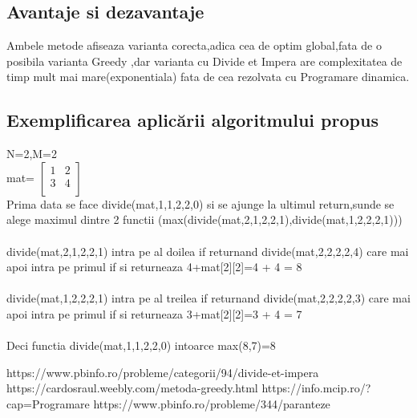 \documentclass[runningheads]{llncs}
\begin{document}
\subsection{Avantaje si dezavantaje}
Ambele metode afiseaza varianta corecta,adica cea de optim global,fata de o posibila varianta Greedy
,dar varianta cu Divide et Impera are complexitatea de timp mult mai mare(exponentiala) fata de cea rezolvata cu Programare dinamica.
\subsection{Exemplificarea aplicării algoritmului propus}
N=2,M=2\\
mat=
$\begin{bmatrix} 
	1 & 2 \\
	3 & 4  \\

\end{bmatrix}$\\
Prima data se face divide(mat,1,1,2,2,0) si se ajunge la ultimul return,sunde se alege maximul dintre 2 functii
(max(divide(mat,2,1,2,2,1),divide(mat,1,2,2,2,1)))\\
\\
divide(mat,2,1,2,2,1) intra pe al doilea if returnand divide(mat,2,2,2,2,4) care mai apoi intra pe primul if si returneaza 4+mat[2][2]=4 + 4 = 8\\
\\
divide(mat,1,2,2,2,1) intra pe al treilea if returnand divide(mat,2,2,2,2,3) care mai apoi intra pe primul if si returneaza 3+mat[2][2]=3 + 4 = 7\\
\\
Deci functia divide(mat,1,1,2,2,0) intoarce max(8,7)=8\\



\begin{thebibliography}{8}
https://www.pbinfo.ro/probleme/categorii/94/divide-et-impera
https://cardosraul.weebly.com/metoda-greedy.html 
https://info.mcip.ro/?cap=Programare%
https://www.pbinfo.ro/probleme/344/paranteze

\end{thebibliography}
\end{document}
